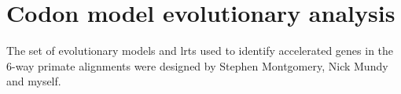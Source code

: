 

\section{Codon model evolutionary analysis}

The set of evolutionary models and \acp{lrt} used to identify
accelerated genes in the 6-way primate alignments were designed by
Stephen Montgomery, Nick Mundy and myself.

